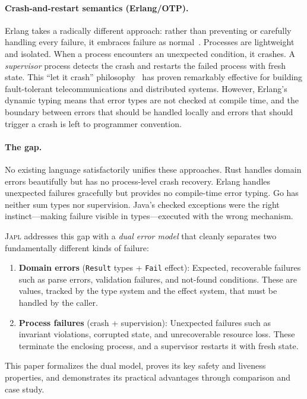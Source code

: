 \documentclass[11pt,twocolumn]{article}
\newcommand{\japl}{\textsc{Japl}}
\newcommand{\Fail}{\texttt{Fail}}
\newcommand{\Result}{\texttt{Result}}
\begin{document}
\paragraph{Crash-and-restart semantics (Erlang/OTP).} Erlang takes a radically different approach: rather than preventing or carefully handling every failure, it embraces failure as normal~\cite{armstrong2003thesis}. Processes are lightweight and isolated. When a process encounters an unexpected condition, it crashes. A \emph{supervisor} process detects the crash and restarts the failed process with fresh state. This ``let it crash'' philosophy~\cite{armstrong2007history} has proven remarkably effective for building fault-tolerant telecommunications and distributed systems. However, Erlang's dynamic typing means that error types are not checked at compile time, and the boundary between errors that should be handled locally and errors that should trigger a crash is left to programmer convention.

\paragraph{The gap.} No existing language satisfactorily unifies these approaches. Rust handles domain errors beautifully but has no process-level crash recovery. Erlang handles unexpected failures gracefully but provides no compile-time error typing. Go has neither sum types nor supervision. Java's checked exceptions were the right instinct---making failure visible in types---executed with the wrong mechanism.

\japl{} addresses this gap with a \emph{dual error model} that cleanly separates two fundamentally different kinds of failure:

\begin{enumerate}[leftmargin=*]
  \item \textbf{Domain errors} (\Result{} types + \Fail{} effect): Expected, recoverable failures such as parse errors, validation failures, and not-found conditions. These are values, tracked by the type system and the effect system, that must be handled by the caller.

  \item \textbf{Process failures} (crash + supervision): Unexpected failures such as invariant violations, corrupted state, and unrecoverable resource loss. These terminate the enclosing process, and a supervisor restarts it with fresh state.
\end{enumerate}

This paper formalizes the dual model, proves its key safety and liveness properties, and demonstrates its practical advantages through comparison and case study.
\end{document}
